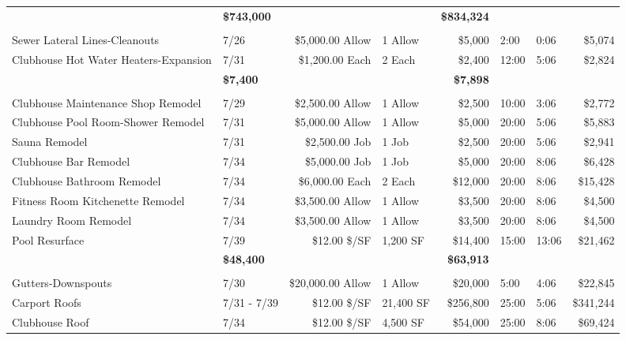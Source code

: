 \documentclass[11pt,letterpaper]{article}
\begin{document}
\begin{longtable}{p{5.1cm} p{1.6cm} r p{1.7cm} r p{1.0cm} p{1.2cm} r}
\addlinespace[1pt] \multicolumn{4}{r}{} & \textbf{\$743,000} & & & \textbf{\$834,324} \\
\addlinespace[6pt]
\multicolumn{8}{l}{\textbf{Plumbing}} \\
\rowcolor{blue!12} Sewer Lateral Lines-Cleanouts & 7/26 & \$5,000.00 Allow & 1 Allow & \$5,000 & 2:00 & 0:06 & \$5,074 \\
Clubhouse Hot Water Heaters-Expansion & 7/31 & \$1,200.00 Each & 2 Each & \$2,400 & 12:00 & 5:06 & \$2,824 \\
\addlinespace[1pt] \multicolumn{4}{r}{} & \textbf{\$7,400} & & & \textbf{\$7,898} \\
\addlinespace[6pt]
\multicolumn{8}{l}{\textbf{Renovation}} \\
\rowcolor{blue!12} Clubhouse Maintenance Shop Remodel & 7/29 & \$2,500.00 Allow & 1 Allow & \$2,500 & 10:00 & 3:06 & \$2,772 \\
Clubhouse Pool Room-Shower Remodel & 7/31 & \$5,000.00 Allow & 1 Allow & \$5,000 & 20:00 & 5:06 & \$5,883 \\
\rowcolor{blue!12} Sauna Remodel & 7/31 & \$2,500.00 Job & 1 Job & \$2,500 & 20:00 & 5:06 & \$2,941 \\
Clubhouse Bar Remodel & 7/34 & \$5,000.00 Job & 1 Job & \$5,000 & 20:00 & 8:06 & \$6,428 \\
\rowcolor{blue!12} Clubhouse Bathroom Remodel & 7/34 & \$6,000.00 Each & 2 Each & \$12,000 & 20:00 & 8:06 & \$15,428 \\
Fitness Room Kitchenette Remodel & 7/34 & \$3,500.00 Allow & 1 Allow & \$3,500 & 20:00 & 8:06 & \$4,500 \\
\rowcolor{blue!12} Laundry Room Remodel & 7/34 & \$3,500.00 Allow & 1 Allow & \$3,500 & 20:00 & 8:06 & \$4,500 \\
Pool Resurface & 7/39 & \$12.00 \$/SF & 1,200 SF & \$14,400 & 15:00 & 13:06 & \$21,462 \\
\addlinespace[1pt] \multicolumn{4}{r}{} & \textbf{\$48,400} & & & \textbf{\$63,913} \\
\addlinespace[6pt]
\multicolumn{8}{l}{\textbf{Roofing}} \\
\rowcolor{blue!12} Gutters-Downspouts & 7/30 & \$20,000.00 Allow & 1 Allow & \$20,000 & 5:00 & 4:06 & \$22,845 \\
Carport Roofs & 7/31 - 7/39 & \$12.00 \$/SF & 21,400 SF & \$256,800 & 25:00 & 5:06 & \$341,244 \\
\rowcolor{blue!12} Clubhouse Roof & 7/34 & \$12.00 \$/SF & 4,500 SF & \$54,000 & 25:00 & 8:06 & \$69,424 \\

\end{longtable}
\end{document}

